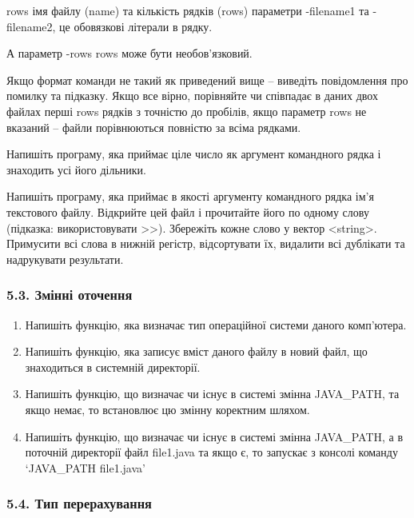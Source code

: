 \documentclass[]{article}
\begin{document}
rows імя файлу (name) та кількість рядків (rows) параметри -filename1 та
-filename2, це обовязкові літерали в рядку.

А параметр -rows rows може бути необов'язковий.

Якщо формат команди не такий як приведений вище -- виведіть повідомлення
про помилку та підказку. Якщо все вірно, порівняйте чи співпадає в даних
двох файлах перші rows рядків з точністю до пробілів, якщо параметр rows
не вказаний -- файли порівнюються повністю за всіма рядками.

Напишіть програму, яка приймає ціле число як аргумент командного рядка і
знаходить усі його дільники.

Напишіть програму, яка приймає в якості аргументу командного рядка ім'я
текстового файлу. Відкрийте цей файл і прочитайте його по одному слову
(підказка: використовувати \textgreater{}\textgreater{}). Збережіть
кожне слово у вектор \textless{}string\textgreater{}. Примусити всі
слова в нижній регістр, відсортувати їх, видалити всі дублікати та
надрукувати результати.

\subsubsection{5.3. Змінні
оточення}\label{ux437ux43cux456ux43dux43dux456-ux43eux442ux43eux447ux435ux43dux43dux44f}

\begin{enumerate}
\def\labelenumi{\arabic{enumi})}
\item
  Напишіть функцію, яка визначає тип операційної системи даного
  комп'ютера.
\item
  Напишіть функцію, яка записує вміст даного файлу в новий файл, що
  знаходиться в системній директорії.
\item
  Напишіть функцію, що визначає чи існує в системі змінна JAVA\_PATH, та
  якщо немає, то встановлює цю змінну коректним шляхом.
\item
  Напишіть функцію, що визначає чи існує в системі змінна JAVA\_PATH, а
  в поточній директорії файл file1.java та якщо є, то запускає з консолі
  команду `JAVA\_PATH file1.java'
\end{enumerate}

\subsubsection{5.4. Тип
перерахування}\label{ux442ux438ux43f-ux43fux435ux440ux435ux440ux430ux445ux443ux432ux430ux43dux43dux44f}
\end{document}
